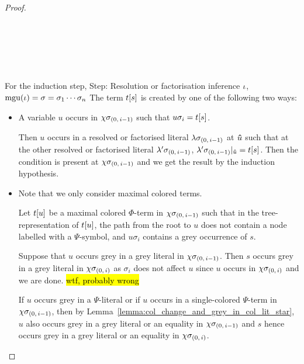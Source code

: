 \documentclass[,%
	draft=false,%
	numbers=noendperiod
	12pt,
	a4paper,
	oneside,%
	openany,
]{memoir}
\newcommand{\inv}{\ensuremath{\chi}}
\begin{document}
\begin{proof}
\begin{itemize}
\begin{itemize}
\begin{itemize}
				\end{itemize}

		\end{itemize}


\end{itemize}





~

~

~

For the induction step,
Step:
Resolution or factorisation inference $\iota$, $\operatorname{mgu}(\iota) = \sigma = \sigma_1\cdots\sigma_n$ 
The term $t[s]$ is created by one of the following two ways: 

\begin{itemize}
	\item
		A variable $u$ occurs in $\inv\sigmazmi$ such that $u\sigma_i = t[s]$.

		Then $u$ occurs in a resolved or factorised literal $\lambda\sigma_{(0,\,i-1)}$ at $\bm\hat u$ such that at the other resolved or factorised literal $\lambda'\sigma_{(0,\,i-1)}$, $\lambda'\sigma_{(0,\,i-1)}|_{\bm\hat u} = t[s]$.
		Then the condition is present at $\inv\sigmazmi$ and we get the result by the induction hypothesis.

	\item 
		Note that we only consider maximal colored terms.

		Let $t[u]$ be a maximal colored $\Phi$-term in $\inv\sigmazmi$ such that in the tree-representation of $t[u]$, the path from the root to $u$ does not contain a node labelled with a $\Psi$-symbol, and $u\sigma_i$ contains a grey occurrence of $s$.


		Suppose that $u$ occurs grey in a grey literal in $\inv\sigmazmi$.
		Then $s$ occurs grey in a grey literal in $\inv\sigmazi$ as $\sigma_i$ does not affect $u$ since $u$ occurs in $\inv\sigmazi$ and we are done. \hl{wtf, probably wrong}

		If $u$ occurs grey in a $\Psi$-literal or
		if $u$ occurs in a single-colored $\Psi$-term in $\inv\sigmazmi$, then by Lemma~\ref{lemma:col_change_and_grey_in_col_lit_star}, $u$ also occurs grey in a grey literal or an equality in $\inv\sigmazmi$ and $s$ hence occurs grey in a grey literal or an equality in $\inv\sigmazi$. 


\end{itemize}
\end{proof}
\end{document}

